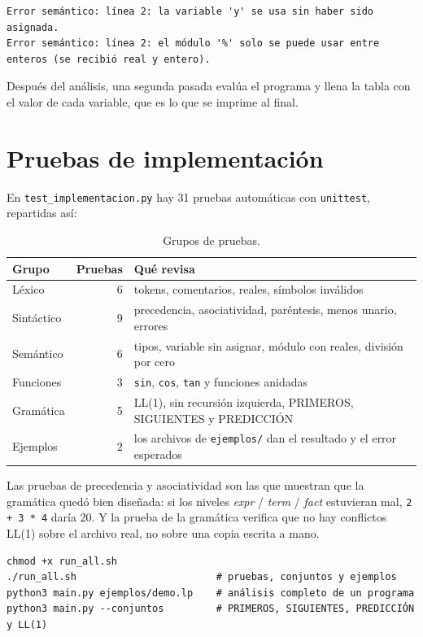 \documentclass[12pt,letterpaper]{article}
\newcommand{\tk}[1]{\texttt{#1}}
\newcommand{\nt}[1]{\textit{#1}}
\begin{document}
\begin{lstlisting}
Error semántico: línea 2: la variable 'y' se usa sin haber sido asignada.
Error semántico: línea 2: el módulo '%' solo se puede usar entre enteros (se recibió real y entero).
\end{lstlisting}

Después del análisis, una segunda pasada evalúa el programa y llena la tabla con el valor de cada variable, que es lo que se imprime al final.

\section{Pruebas de implementación}

En \tk{test\_implementacion.py} hay 31 pruebas automáticas con \tk{unittest}, repartidas así:

\begin{table}[H]
\centering
\caption{Grupos de pruebas.}
\small
\begin{tabular}{l r p{8.0cm}}
\toprule
Grupo & Pruebas & Qué revisa \\
\midrule
Léxico & 6 & tokens, comentarios, reales, símbolos inválidos \\
Sintáctico & 9 & precedencia, asociatividad, paréntesis, menos unario, errores \\
Semántico & 6 & tipos, variable sin asignar, módulo con reales, división por cero \\
Funciones & 3 & \tk{sin}, \tk{cos}, \tk{tan} y funciones anidadas \\
Gramática & 5 & LL(1), sin recursión izquierda, PRIMEROS, SIGUIENTES y PREDICCIÓN \\
Ejemplos & 2 & los archivos de \tk{ejemplos/} dan el resultado y el error esperados \\
\bottomrule
\end{tabular}
\end{table}

Las pruebas de precedencia y asociatividad son las que muestran que la gramática quedó bien diseñada: si los niveles \nt{expr} / \nt{term} / \nt{fact} estuvieran mal, \tk{2 + 3 * 4} daría 20. Y la prueba de la gramática verifica que no hay conflictos LL(1) sobre el archivo real, no sobre una copia escrita a mano.

\begin{lstlisting}[caption={Comandos usados.}]
chmod +x run_all.sh
./run_all.sh                        # pruebas, conjuntos y ejemplos
python3 main.py ejemplos/demo.lp    # análisis completo de un programa
python3 main.py --conjuntos         # PRIMEROS, SIGUIENTES, PREDICCIÓN y LL(1)
\end{lstlisting}
\end{document}
